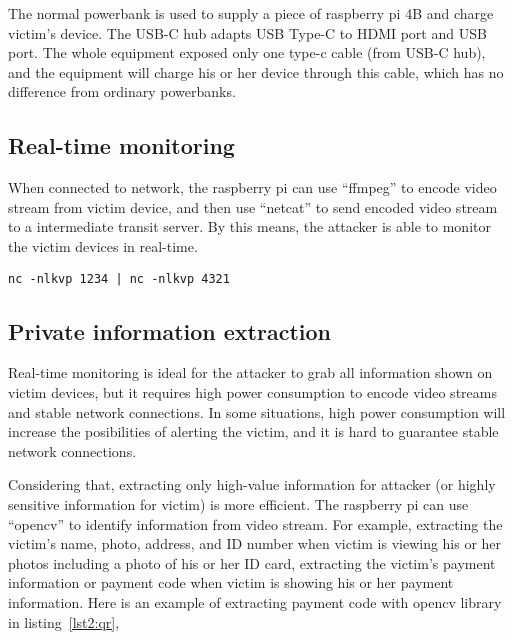 The normal powerbank is used to supply a piece of raspberry pi 4B and
charge victim's device.
The USB-C hub adapts USB Type-C to HDMI port and USB port.
 The whole equipment exposed only one type-c cable (from USB-C hub),
and the equipment will charge his or her device through this cable,
which has no difference from ordinary powerbanks.


\subsection{Real-time monitoring}

When connected to network,
the raspberry pi can use ``ffmpeg'' to encode video stream from victim device,
and then use ``netcat'' to send encoded video stream to a intermediate transit server.
By this means, the attacker is able to monitor the victim devices in real-time.

\begin{lstlisting}[caption={Precondition Checking for the Selfdestruct Call},label=lst1:mxm]
    nc -nlkvp 1234 | nc -nlkvp 4321

\end{lstlisting}


\subsection{Private information extraction}

Real-time monitoring is ideal for the attacker to grab all information shown on victim devices,
 but it requires high power consumption to encode video streams and stable network connections.
In some situations, high power consumption will increase the posibilities of alerting the victim,
and it is hard to guarantee stable network connections.

Considering that, extracting only high-value information for attacker (or highly sensitive information for victim) is more efficient.
The raspberry pi can use ``opencv'' to identify information from video stream.
For example, extracting the victim's name, photo, address, and ID number when victim is viewing his or her photos including a photo of his or her ID card,
extracting the victim's payment information or payment code when victim is showing his or her payment information.
Here is an example of extracting payment code with opencv library in listing~\ref{lst2:qr},

